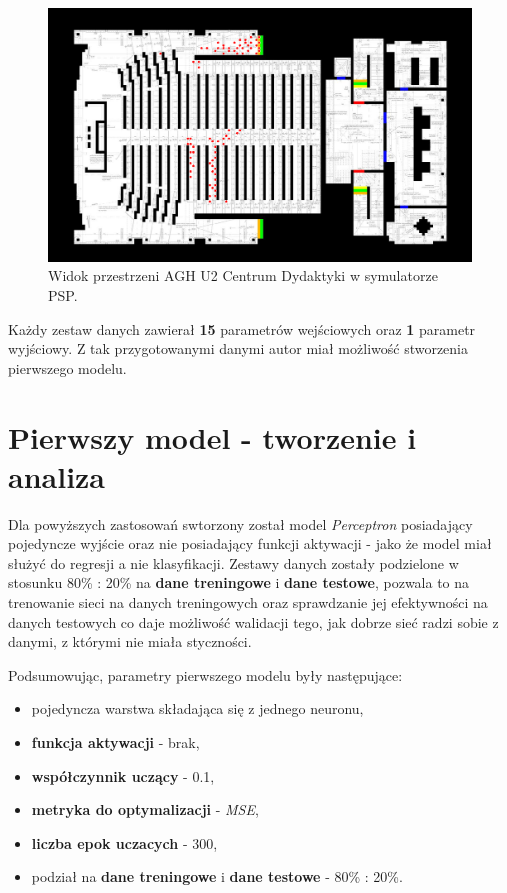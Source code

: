 \documentclass[12pt]{aghdpl}
\newenvironment{tightcenter}{
  \setlength\topsep{0pt}
  \setlength\parskip{0pt}
  \begin{center}
}{
  \end{center}
}
\begin{document}
		\begin{figure}[h]
			\begin{tightcenter}
			 	\includegraphics[width = \linewidth]{rysunki/agh_u2.png}
			\end{tightcenter}	 			
			 			
		 	\caption{Widok przestrzeni AGH U2 Centrum Dydaktyki w symulatorze PSP.}
			\label{fig: agh_u2_centrum_dydaktyki}
		\end{figure}
		
		Każdy zestaw danych zawierał \textbf{15} parametrów wejściowych oraz \textbf{1} parametr wyjściowy. Z tak przygotowanymi danymi autor miał możliwość stworzenia pierwszego modelu.
		
		\section{Pierwszy model - tworzenie i analiza} \label{pierwszy_model_tworzenie_i_analiza}
		Dla powyższych zastosowań swtorzony został model \textit{Perceptron} posiadający pojedyncze wyjście oraz nie posiadający funkcji aktywacji - jako że model miał służyć do regresji a nie klasyfikacji. Zestawy danych zostały podzielone w stosunku 80\% : 20\% na \textbf{dane treningowe} i \textbf{dane testowe}, pozwala to na trenowanie sieci na danych treningowych oraz sprawdzanie jej efektywności na danych testowych co daje możliwość walidacji tego, jak dobrze sieć radzi sobie z danymi, z którymi nie miała styczności.
		
		Podsumowując, parametry pierwszego modelu były następujące:
		\begin{itemize}
		\item pojedyncza warstwa składająca się z jednego neuronu,
		\item \textbf{funkcja aktywacji} - brak,
		\item \textbf{współczynnik uczący} - 0.1,
		\item \textbf{metryka do optymalizacji} - \textit{MSE},
		\item \textbf{liczba epok uczacych} - 300,
		\item podział na \textbf{dane treningowe} i \textbf{dane testowe} - 80\% : 20\%.
		\end{itemize}
				
\end{document}
